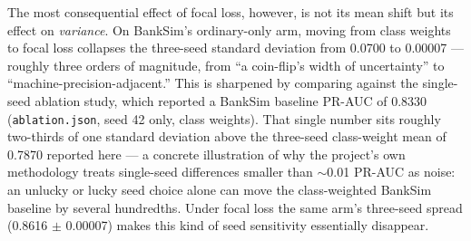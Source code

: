 \begin{table}[t]
\centering
\caption{Three-seed test PR-AUC, class weights vs.\ focal loss ($\gamma{=}2.0$), ordinary-only (A) and ordinary+topology (B) arms. $\Delta$ = focal $-$ class-weight. $^\dagger$synth\_erp is synthetic and never used as thesis evidence.}
\label{tab:focal-arms}
\end{table}

The most consequential effect of focal loss, however, is not its mean shift but its effect on \emph{variance}. On BankSim's ordinary-only arm, moving from class weights to focal loss collapses the three-seed standard deviation from 0.0700 to 0.00007 --- roughly three orders of magnitude, from ``a coin-flip's width of uncertainty'' to ``machine-precision-adjacent.'' This is sharpened by comparing against the single-seed ablation study, which reported a BankSim baseline PR-AUC of 0.8330 (\texttt{ablation.json}, seed 42 only, class weights). That single number sits roughly two-thirds of one standard deviation above the three-seed class-weight mean of 0.7870 reported here --- a concrete illustration of why the project's own methodology treats single-seed differences smaller than $\sim$0.01 PR-AUC as noise: an unlucky or lucky seed choice alone can move the class-weighted BankSim baseline by several hundredths. Under focal loss the same arm's three-seed spread (0.8616 $\pm$ 0.00007) makes this kind of seed sensitivity essentially disappear.

